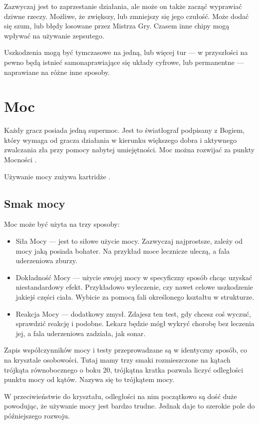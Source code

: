 Zazwyczaj jest to zaprzestanie działania, ale może on także zacząć wyprawiać dziwne rzeczy.
Możliwe, że zwiększy, lub zmniejszy się jego czułość.
Może dodać się szum, lub błędy losowane przez Mistrza Gry.
Czasem inne chipy mogą wpływać na używanie zepsutego.

Uszkodzenia mogą być tymczasowe na jedną, lub więcej tur --- w przyszłości na pewno będą istnieć samonaprawiające się układy cyfrowe, lub permanentne --- naprawiane na różne inne sposoby.

\section{Moc}
Każdy gracz posiada jedną supermoc.
Jest to światłograf podpisany z Bogiem, który wymaga od gracza działania w kierunku większego dobra i aktywnego zwalczania zła przy pomocy nabytej umiejętności.
Moc można rozwijać za punkty Mocności \xpmcn{}.

Używanie mocy zużywa kartridże \abkar{}.

\subsection{Smak mocy}
Moc może być użyta na trzy sposoby:
\begin{itemize}
 \item Siła Mocy \absm{} --- jest to siłowe użycie mocy. Zazwyczaj najprostsze, zależy od mocy jaką posiada bohater. Na przykład moce lecznicze uleczą, a fala uderzeniowa zburzy.
 \item Dokładność Mocy \abdm{} --- użycie swojej mocy w specyficzny sposób chcąc uzyskać niestandardowy efekt. Przykładowo wyleczenie, czy nawet celowe uszkodzenie jakiejś części ciała. Wybicie za pomocą fali określonego kształtu w strukturze.
 \item Reakcja Mocy \abrm{} --- dodatkowy zmysł. Zdajesz ten test, gdy chcesz coś wyczuć, sprawdzić reakcję i podobne. Lekarz będzie mógł wykryć chorobę bez leczenia jej, a fala uderzeniowa zadziała, jak sonar.
\end{itemize}

Zapis współczynników mocy i testy przeprowadzane są w identyczny sposób, co na krysztale osobowości.
Tutaj mamy trzy smaki rozmieszczone na kątach trójkąta równobocznego o boku 20, trójkątna kratka pozwala liczyć odległości punktu mocy od kątów.
Nazywa się to trójkątem mocy.

W przeciwieństwie do kryształu, odległości na nim początkowo są dość duże powodując, że używanie mocy jest bardzo trudne.
Jednak daje to szerokie pole do późniejszego rozwoju.

